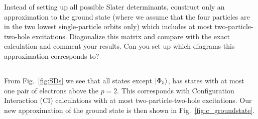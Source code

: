 
Instead of setting up all possible Slater determinants, construct only an approximation to the ground state (where we assume that the four particles are in the two lowest single-particle orbits only) which includes at most two-particle-two-hole excitations.
Diagonalize this matrix and compare with the exact calculation and comment your results.
Can you set up which diagrams this approximation corresponds to?

\subsection{}
From Fig.~\ref{fig:SDs} we see that all states except $\lvert\Phi_5\rangle$, has states with at most one pair of electrons above the $p=2$.
This corresponds with Configuration Interaction (CI) calculations with at most two-particle-two-hole excitations.
Our new approximation of the ground state is then shown in Fig.~\ref{fig:c_groundstate}.

